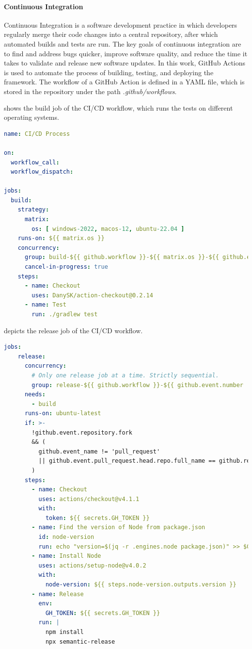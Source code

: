 \documentclass[12pt,a4paper,openright,twoside]{book}
\begin{document}
\paragraph*{Continuous Integration}
Continuous Integration is a software development practice in which developers regularly merge their code changes into a central repository, after which automated builds and tests are run.
The key goals of continuous integration are to find and address bugs quicker, improve software quality, and reduce the time it takes to validate and release new software updates.
In this work, GitHub Actions is used to automate the process of building, testing, and deploying the framework.
The workflow of a GitHub Action is defined in a YAML file, which is stored in the repository under the path \textit{.github/workflows}.

 shows the build job of the CI/CD workflow, which runs the tests on different operating systems.

\begin{lstlisting}[language=yaml, label={lst:ci-build}, caption={CI/CD workflow: build job.}]
name: CI/CD Process

on:
  workflow_call:
  workflow_dispatch:

jobs:
  build:
    strategy:
      matrix:
        os: [ windows-2022, macos-12, ubuntu-22.04 ]
    runs-on: ${{ matrix.os }}
    concurrency:
      group: build-${{ github.workflow }}-${{ matrix.os }}-${{ github.event.number || github.ref }}
      cancel-in-progress: true
    steps:
      - name: Checkout
        uses: DanySK/action-checkout@0.2.14
      - name: Test
        run: ./gradlew test
\end{lstlisting}

 depicts the release job of the CI/CD workflow.

\begin{lstlisting}[language=yaml, label={lst:ci-release}, caption={CI/CD workflow: release job.}]
  jobs:
    release:
      concurrency:
        # Only one release job at a time. Strictly sequential.
        group: release-${{ github.workflow }}-${{ github.event.number || github.ref }}
      needs:
        - build
      runs-on: ubuntu-latest
      if: >-
        !github.event.repository.fork
        && (
          github.event_name != 'pull_request'
          || github.event.pull_request.head.repo.full_name == github.repository
        )
      steps:
        - name: Checkout
          uses: actions/checkout@v4.1.1
          with:
            token: ${{ secrets.GH_TOKEN }}
        - name: Find the version of Node from package.json
          id: node-version
          run: echo "version=$(jq -r .engines.node package.json)" >> $GITHUB_OUTPUT
        - name: Install Node
          uses: actions/setup-node@v4.0.2
          with:
            node-version: ${{ steps.node-version.outputs.version }}
        - name: Release
          env:
            GH_TOKEN: ${{ secrets.GH_TOKEN }}
          run: |
            npm install
            npx semantic-release
  \end{lstlisting}
\end{document}
